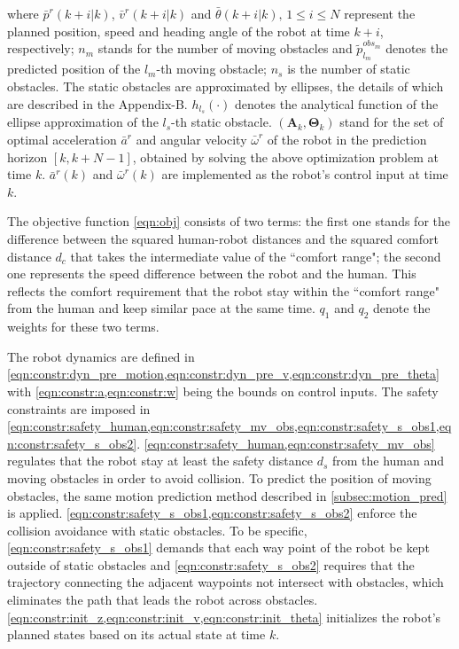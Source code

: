 \documentclass[letterpaper, 10 pt, conference]{ieeeconf}
\begin{document}
	where $\bar{p}^r(k+i|k)$, $\bar{v}^r(k+i|k)$ and $\bar{\theta}(k+i|k),\, 1\le i\le N$ represent the planned position, speed and heading angle of the robot at time $k+i$, respectively;
	$n_m$ stands for the number of moving obstacles and $\tilde{p}^{obs_m}_{l_m}$ denotes the predicted position of the $l_m$-th moving obstacle;
	$n_s$ is the number of static obstacles.
	The static obstacles are approximated by ellipses, the details of which are described in the Appendix-B.
	$h_{l_s}(\cdot)$ denotes the analytical function of the ellipse approximation of the $l_s$-th static obstacle.
	$(\mathbf{A}_k,\mathbf{\Theta}_k)$ stand for the set of optimal acceleration $\bar{a}^r$ and angular velocity $\bar{\omega}^r$ of the robot in the prediction horizon $[k,k+N-1]$, obtained by solving the above optimization problem at time $k$.
	$\bar{a}^r(k)$ and $\bar{\omega}^r(k)$ are implemented as the robot's control input at time $k$.
	
	The objective function \cref{eqn:obj} consists of two terms: the first one stands for the difference between the squared human-robot distances and the squared comfort distance $d_c$ that takes the intermediate value of the ``comfort range"; the second one represents the speed difference between the robot and the human.
	This reflects the comfort requirement that the robot stay within the ``comfort range" from the human and keep similar pace at the same time.
	$q_1$ and $q_2$ denote the weights for these two terms.
	
	The robot dynamics are defined in \cref{eqn:constr:dyn_pre_motion,eqn:constr:dyn_pre_v,eqn:constr:dyn_pre_theta} with \cref{eqn:constr:a,eqn:constr:w} being the bounds on control inputs.
	The safety constraints are imposed in \cref{eqn:constr:safety_human,eqn:constr:safety_mv_obs,eqn:constr:safety_s_obs1,eqn:constr:safety_s_obs2}.
	\cref{eqn:constr:safety_human,eqn:constr:safety_mv_obs} regulates that the robot stay at least the safety distance $d_s$ from the human and moving obstacles in order to avoid collision.
	To predict the position of moving obstacles, the same motion prediction method described in \cref{subsec:motion_pred} is applied.
	\cref{eqn:constr:safety_s_obs1,eqn:constr:safety_s_obs2} enforce the collision avoidance with static obstacles.
	To be specific, \cref{eqn:constr:safety_s_obs1} demands that each way point of the robot be kept outside of static obstacles and	\cref{eqn:constr:safety_s_obs2} requires that the trajectory connecting the adjacent waypoints not intersect with obstacles, which eliminates the path that leads the robot across obstacles.
	\cref{eqn:constr:init_z,eqn:constr:init_v,eqn:constr:init_theta} initializes the robot's planned states based on its actual state at time $k$.
	
\end{document}
